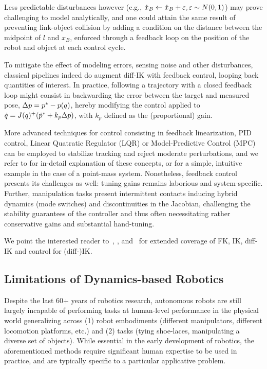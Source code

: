 Less predictable disturbances however (e.g., \( \dot x_B \leftarrow \dot x_B + {\varepsilon}, {\varepsilon} \sim N(0,1) \)) may prove challenging to model analytically, and one could attain the same result of preventing link-object collision by adding a condition on the distance between the midpoint of \( l \) and \( x_B \), enforced through a feedback loop on the position of the robot and object at each control cycle.

To mitigate the effect of modeling errors, sensing noise and other disturbances, classical pipelines indeed do augment diff-IK with feedback control, looping back quantities of interest.
In practice, following a trajectory with a closed feedback loop might consist in backwarding the error between the target and measured pose, \( \Delta p = p^* - p(q) \), hereby modifying the control applied to \( \dot q = J(q)^+ (\dot {p}^* + k_p \Delta p ) \), with \( k_p \) defined as the (proportional) gain.

More advanced techniques for control consisting in feedback linearization, PID control, Linear Quatratic Regulator (LQR) or Model-Predictive Control (MPC) can be employed to stabilize tracking and reject moderate perturbations, and we refer to \citet[Chapter~8]{sicilianoSpringerHandbookRobotics2016} for in-detail explanation of these concepts, or \citep[Chapter~8]{tedrakeRoboticManipulationPerception} for a simple, intuitive example in the case of a point-mass system.
Nonetheless, feedback control presents its challenges as well: tuning gains remains laborious and system-specific. 
Further, manipulation tasks present intermittent contacts inducing hybrid dynamics (mode switches) and discontinuities in the Jacobian, challenging the stability guarantees of the controller and thus often necessitating rather conservative gains and substantial hand-tuning.

We point the interested reader to~\citet[Chapter~2,7,8]{sicilianoSpringerHandbookRobotics2016}, \citet[Chapter~6,11]{lynchModernRoboticsMechanics2017}, and~\citet[Chapter~3,8]{tedrakeRoboticManipulationPerception} for extended coverage of FK, IK, diff-IK and control for (diff-)IK.

\subsection{Limitations of Dynamics-based Robotics}
Despite the last 60+ years of robotics research, autonomous robots are still largely incapable of performing tasks at human-level performance in the physical world generalizing across (1) robot embodiments (different manipulators, different locomotion platforms, etc.) and (2) tasks (tying shoe-laces, manipulating a diverse set of objects).
While essential in the early development of robotics, the aforementioned methods require significant human expertise to be used in practice, and are typically specific to a particular applicative problem.

